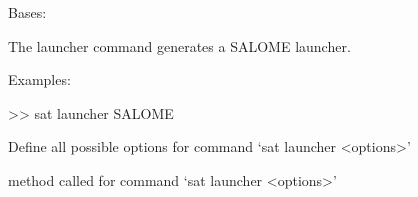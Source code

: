 \documentclass[a4paper,10pt,english]{sphinxmanual}
\begin{document}
\begin{fulllineitems}
\label{\detokenize{apidoc_commands/commands:commands.launcher.Command}}
Bases: 

The launcher command generates a SALOME launcher.

\begin{DUlineblock}{0em}
\item[] Examples:
\item[] \textgreater{}\textgreater{} sat launcher SALOME 
\end{DUlineblock}

\begin{fulllineitems}
\label{\detokenize{apidoc_commands/commands:commands.launcher.Command.getParser}}
Define all possible options for command ‘sat launcher \textless{}options\textgreater{}’

\end{fulllineitems}


\begin{fulllineitems}
\label{\detokenize{apidoc_commands/commands:commands.launcher.Command.name}}
\end{fulllineitems}


\begin{fulllineitems}
\label{\detokenize{apidoc_commands/commands:commands.launcher.Command.run}}
method called for command ‘sat launcher \textless{}options\textgreater{}’

\end{fulllineitems}


\end{fulllineitems}

\end{document}
